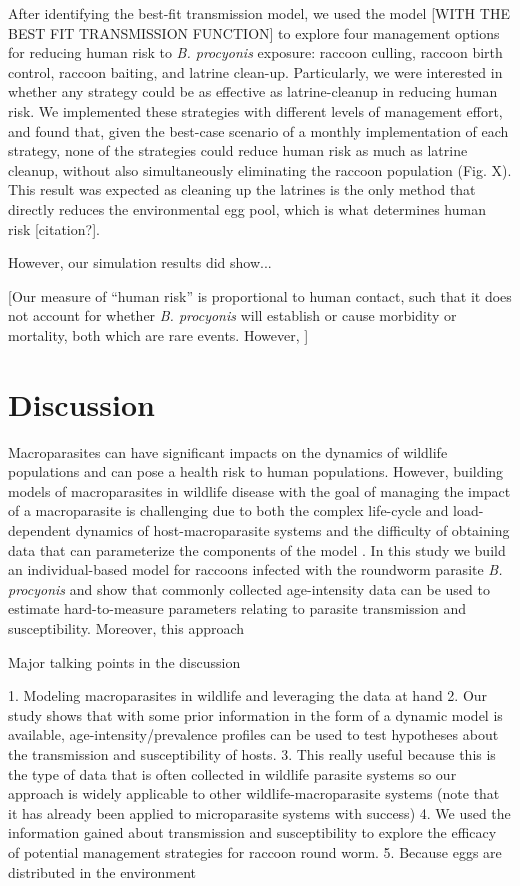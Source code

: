 \documentclass[11pt]{article}
\begin{document}
After identifying the best-fit transmission model, we used the model [WITH THE BEST FIT TRANSMISSION FUNCTION] to explore four management options for reducing human risk to \emph{B. procyonis} exposure: raccoon culling, raccoon birth control, raccoon baiting, and latrine clean-up.  Particularly, we were interested in whether any strategy could be as effective as latrine-cleanup in reducing human risk.  We implemented these strategies with different levels of management effort, and found that, given the best-case scenario of a monthly implementation of each strategy, none of the strategies could reduce human risk as much as latrine cleanup, without also simultaneously eliminating the raccoon population (Fig. X).  This result was expected as cleaning up the latrines is the only method that directly reduces the environmental egg pool, which is what determines human risk [citation?].

However, our simulation results did show...

[Our measure of ``human risk'' is proportional to human contact, such that it does not account for whether \emph{B. procyonis} will establish or cause morbidity or mortality, both which are rare events. However, ]

\section{Discussion}

Macroparasites can have significant impacts on the dynamics of wildlife populations and can pose a health risk to human populations.  However, building models of macroparasites in wildlife disease with the goal of managing the impact of a macroparasite is challenging due to both the complex life-cycle and load-dependent dynamics of host-macroparasite systems and the difficulty of obtaining data that can parameterize the components of the model \citep{McCallum2017}. In this study we build an individual-based model for raccoons infected with the roundworm parasite \emph{B. procyonis} and show that commonly collected age-intensity data can be used to estimate hard-to-measure parameters relating to parasite transmission and susceptibility. Moreover, this approach 

Major talking points in the discussion

1. Modeling macroparasites in wildlife and leveraging the data at hand
2. Our study shows that with some prior information in the form of a dynamic model is available, age-intensity/prevalence profiles can be used to test hypotheses about the transmission and susceptibility of hosts.
3. This really useful because this is the type of data that is often collected in wildlife parasite systems so our approach is widely applicable to other wildlife-macroparasite systems (note that it has already been applied to microparasite systems with success)
4. We used the information gained about transmission and susceptibility to explore the efficacy of potential management strategies for raccoon round worm. 
5. Because eggs are distributed in the environment
\end{document}
